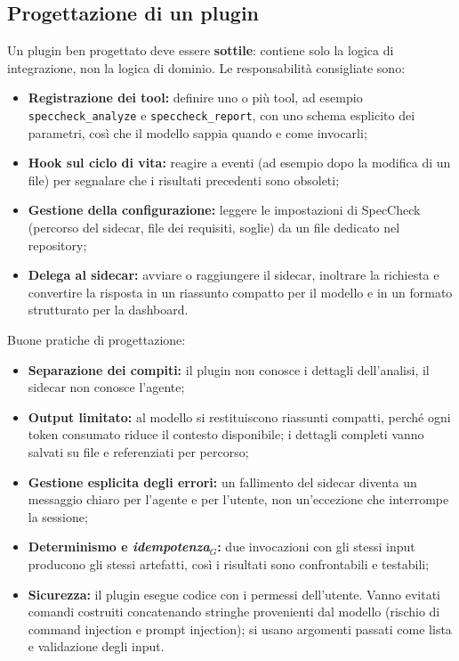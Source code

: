 \documentclass[a4paper, 11pt]{article}
\newcommand{\term}[1]{\textit{#1}$_G$} %
\begin{document}
\subsection{Progettazione di un plugin}
Un plugin ben progettato deve essere \textbf{sottile}: contiene solo la logica di integrazione, non la logica di dominio. Le responsabilità consigliate sono:
\begin{itemize}[noitemsep]
    \item \textbf{Registrazione dei tool:} definire uno o più tool, ad esempio \texttt{speccheck\_analyze} e \texttt{speccheck\_report}, con uno schema esplicito dei parametri, così che il modello sappia quando e come invocarli;
    \item \textbf{Hook sul ciclo di vita:} reagire a eventi (ad esempio dopo la modifica di un file) per segnalare che i risultati precedenti sono obsoleti;
    \item \textbf{Gestione della configurazione:} leggere le impostazioni di SpecCheck (percorso del sidecar, file dei requisiti, soglie) da un file dedicato nel repository;
    \item \textbf{Delega al sidecar:} avviare o raggiungere il sidecar, inoltrare la richiesta e convertire la risposta in un riassunto compatto per il modello e in un formato strutturato per la dashboard.
\end{itemize}
Buone pratiche di progettazione:
\begin{itemize}[noitemsep]
    \item \textbf{Separazione dei compiti:} il plugin non conosce i dettagli dell'analisi, il sidecar non conosce l'agente;
    \item \textbf{Output limitato:} al modello si restituiscono riassunti compatti, perché ogni token consumato riduce il contesto disponibile; i dettagli completi vanno salvati su file e referenziati per percorso;
    \item \textbf{Gestione esplicita degli errori:} un fallimento del sidecar diventa un messaggio chiaro per l'agente e per l'utente, non un'eccezione che interrompe la sessione;
    \item \textbf{Determinismo e \term{idempotenza}:} due invocazioni con gli stessi input producono gli stessi artefatti, così i risultati sono confrontabili e testabili;
    \item \textbf{Sicurezza:} il plugin esegue codice con i permessi dell'utente. Vanno evitati comandi costruiti concatenando stringhe provenienti dal modello (rischio di command injection e prompt injection); si usano argomenti passati come lista e validazione degli input.
\end{itemize}
\end{document}
